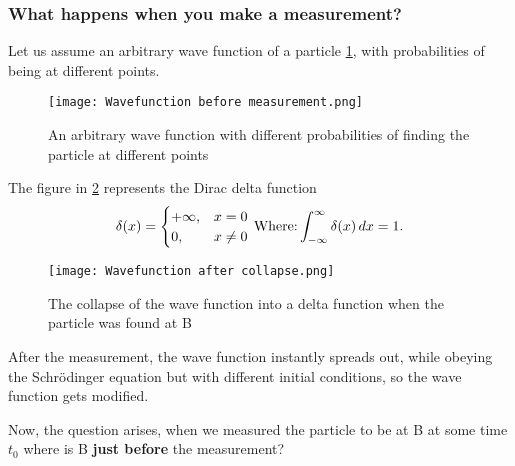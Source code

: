 \documentclass{article}
\begin{document}
\subsubsection{\Large \textbf{What happens when you make a measurement?}}

Let us assume an arbitrary wave function of a particle \ref{fig:Before measurement}, with probabilities of being at different points.



\begin{figure}
\centering
     \texttt{[image: Wavefunction before measurement.png]}
      \caption{An arbitrary wave function with different probabilities of finding the particle at different points}
       \label{fig:Before measurement}
\end{figure}



The figure in \ref{fig:collapse} represents the Dirac delta function
\begin{equation}
    \delta (x)={\begin{cases}+\infty ,&x=0\\0,&x\neq 0\end{cases}}
    \label{eq:4}\\
    \ \text{Where:} \int _{-\infty }^{\infty }\delta (x)\,dx=1.
\end{equation}

\begin{figure}
\centering
     \texttt{[image: Wavefunction after collapse.png]}
      \caption{The collapse of the wave function into a delta function when the particle was found at B }
       \label{fig:collapse}
\end{figure}




After the measurement, the wave function instantly spreads out, while obeying the Schr\"{o}dinger equation but with different initial conditions, so the wave function gets modified.

Now, the question arises, when we measured the particle to be at B at some time $t_0$ where is B \textbf{just before} the measurement?
\end{document}
